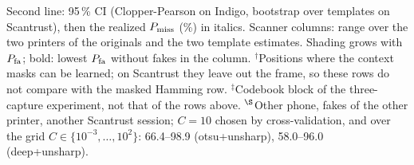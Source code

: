 \begin{table}[t]
\begin{tabular}{@{}l cc cc cc@{}}
    \bottomrule
  \end{tabular}
  \par\vspace{3pt}
  \parbox{\textwidth}{\scriptsize Second line: 95\,\% CI (Clopper-Pearson on Indigo, bootstrap over templates on Scantrust), then the realized $P_{\mathrm{miss}}$ (\%) in italics. Scanner columns: range over the two printers of the originals and the two template estimates. Shading grows with $P_{\mathrm{fa}}$; bold: lowest $P_{\mathrm{fa}}$ without fakes in the column. $^\dagger$Positions where the context masks can be learned; on Scantrust they leave out the frame, so these rows do not compare with the masked Hamming row. $^\ddagger$Codebook block of the three-capture experiment, not that of the rows above. $^\S$Other phone, fakes of the other printer, another Scantrust session; $C=10$ chosen by cross-validation, and over the grid $C\in\{10^{-3},\dots,10^{2}\}$: 66.4--98.9 (otsu+unsharp), 58.0--96.0 (deep+unsharp).}
\end{table}
